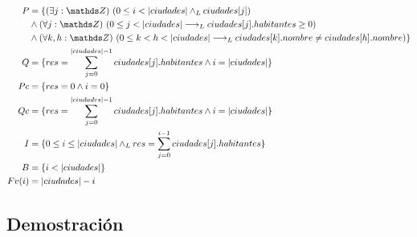 \documentclass[50pt,a4paper]{article}
\newcommand{\invariante}[1]{0 \leq #1 \leq |ciudades| \yLuego res = \sum\limits_{j=0}^{#1 - 1} ciudades[j].habitantes}
\begin{document}
\begin{align*}
    P &= \{ \existe[unalinea]{j}{\ent}{0 \leq i < |ciudades| \yLuego ciudades[j]}\\
    &\land \paraTodo[unalinea]{j}{\ent}{0 \leq j < |ciudades| \implicaLuego ciudades[j].habitantes \geq 0}\\
    &\land \paraTodo[unalinea]{k, h}{\ent}{0 \leq k < h < |ciudades| \implicaLuego ciudades[k].nombre \neq ciudades[h].nombre} \}\\
    Q &= \{ res = \sum\limits_{j=0}^{|ciudades| - 1} ciudades[j].habitantes \land i = |ciudades| \}\\
    Pc &= \{ res = 0 \land i = 0 \}\\
    Qc &= \{ res = \sum\limits_{j=0}^{|ciudades| - 1} ciudades[j].habitantes \land i = |ciudades| \}\\
    I &= \{\invariante{i}\}\\
    B &= \{ i < |ciudades| \}\\
    Fv(i) &= |ciudades| - i
\end{align*}
\newpage
\subsection{Demostración}
\end{document}
